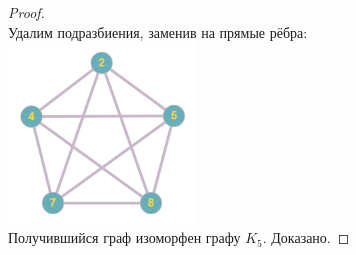 \documentclass[a4paper,12pt]{article}
\theoremstyle{remark}
\begin{document}
\begin{proof}
	\\ Удалим подразбиения, заменив на прямые рёбра:
	\\ \includegraphics[width=5cm]{kuratovsky-task1-stage4.png}
	\\ Получившийся граф изоморфен графу $K_5$. Доказано.
\end{proof}
\end{document}
